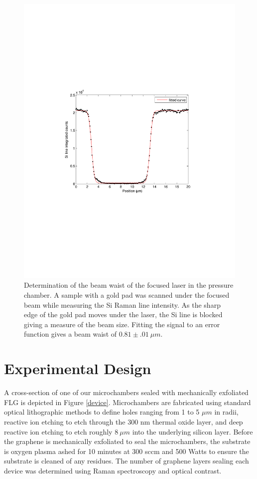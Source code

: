 \begin{figure}
\begin{center}
\includegraphics[scale=1]{Figs_Friction/SpotSize.pdf}
\end{center}
\caption{\label{waist}Determination of the beam waist of the focused laser in the pressure chamber. A sample with a gold pad was scanned under the focused beam while measuring the Si Raman line intensity. As the sharp edge of the gold pad moves under the laser, the Si line is blocked giving a measure of the beam size. Fitting the signal to an error function gives a beam waist of $0.81 \pm .01 \ \mu m$.}
\end{figure}

\section{Experimental Design}
A cross-section of one of our microchambers sealed with mechanically exfoliated FLG is depicted in Figure \ref{device}. Microchambers are fabricated using standard optical lithographic methods to define holes ranging from 1 to 5 $\mu m$ in radii,  reactive ion etching to etch through the 300 nm thermal oxide layer, and deep reactive ion etching to etch roughly $8 \ \mu m$ into the underlying silicon layer.  Before the graphene is mechanically exfoliated to seal the microchambers, the substrate is oxygen plasma ashed for 10 minutes at 300 sccm and 500 Watts to ensure the substrate is cleaned of any residues. The number of graphene layers sealing each device was determined using Raman spectroscopy\cite{Ferrari2006} and optical contrast\cite{Blake2007,Casiraghi2007a}.

